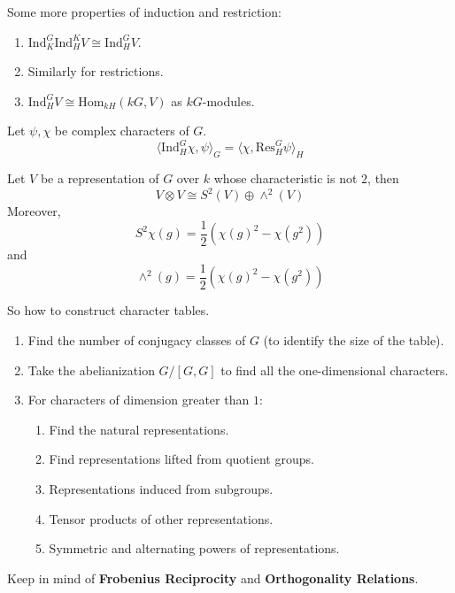 \documentclass[openany]{book}
\newcommand{\la}{\langle}
\newcommand{\ra}{\rangle}
\begin{document}
\begin{prop}
    Some more properties of induction and restriction:
    \begin{enumerate}
        \item $\text{Ind}_K^G\text{Ind}_H^KV\cong\text{Ind}_H^GV$.
        \item Similarly for restrictions.
        \item $\text{Ind}_H^GV\cong\text{Hom}_{kH}(kG, V)$ as $kG$-modules.
    \end{enumerate}
\end{prop}

\begin{prop}
    Let $\psi,\chi$ be complex characters of $G$.
    \begin{equation*}
        \la\text{Ind}_H^G\chi, \psi\ra_G=\la \chi,\text{Res}_H^G\psi\ra_H
    \end{equation*}
\end{prop}


\begin{prop}
    Let $V$ be a representation of $G$ over $k$ whose characteristic is not $2$, then
    \begin{equation*}
        V\otimes V\cong S^2(V)\oplus\wedge^2(V)
    \end{equation*}
    Moreover, 
    \begin{equation*}
        S^2\chi(g)=\frac{1}{2}(\chi(g)^2-\chi(g^2))
    \end{equation*}
    and 
    \begin{equation*}
        \wedge^2(g)=\frac{1}{2}(\chi(g)^2-\chi(g^2))
    \end{equation*}
\end{prop}

\begin{warn}
    So how to construct character tables.
\end{warn}
\begin{prop}
    \begin{enumerate}
        \item Find the number of conjugacy classes of $G$ (to identify the size of the table).
        \item Take the abelianization $G/[G,G]$ to find all the one-dimensional characters.
        \item For characters of dimension greater than $1$: 
        \begin{enumerate}
            \item Find the natural representations.
            \item Find representations lifted from quotient groups.
            \item Representations induced from subgroups.
            \item Tensor products of other representations.
            \item Symmetric and alternating powers of representations.
        \end{enumerate}
    \end{enumerate}
    Keep in mind of \textbf{Frobenius Reciprocity} and \textbf{Orthogonality Relations}.
\end{prop}
\end{document}
